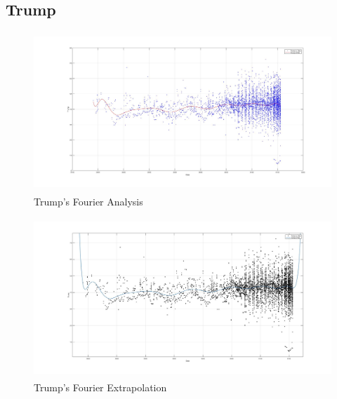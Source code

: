 \documentclass[twoside]{article}
\begin{document}
\subsection{Trump}
\begin{figure}[H]
  \centering
    \includegraphics[width=\textwidth,height=6cm]{images/fourier/trump.jpg}
    \caption{Trump's Fourier Analysis}
\end{figure}
\begin{figure}[H]
  \centering
    \includegraphics[width=\textwidth,height=6cm]{images/fourier/trumplarge.jpg}
    \caption{Trump's Fourier Extrapolation}
\end{figure}
\end{document}
